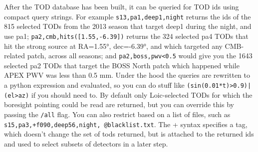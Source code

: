 \documentclass[a4paper, 11pt]{article}
\begin{document}
After the TOD database has been built, it can be queried for TOD ids using compact query strings.
For example \texttt{s13,pa1,deep1,night} returns the ids of the 815 selected TODs from the 2013 season
that target deep1 during the night, and use pa1; \texttt{pa2,cmb,hits([1.55,-6.39])} returns
the 324 selected pa4 TODs that hit the strong source at RA=\ang{1.55}, dec=\ang{-6.39}, and
which targeted any CMB-related patch, across all seasons; and \texttt{pa2,boss,pwv<0.5} would
give you the 1643 selected pa2 TODs that target the BOSS North patch which happened while
APEX PWV was less than 0.5 mm. Under the hood the queries are rewritten to a python
expression and evaluated, so you can do stuff like \texttt{(sin(0.01*t)>0.9)|(el>az)} if you should need to.
By default only Loic-selected TODs for which the boresight pointing could be read are returned,
but you can override this by passing the \texttt{/all} flag. You can also restrict based on a list
of files, such as \texttt{s15,pa3,+f090,deep56,night,~@blacklist.txt}. The + syntax specifies a tag,
which doesn't change the set of tods returned, but is attached to the returned ids and used to select
subsets of detectors in a later step.
\end{document}
